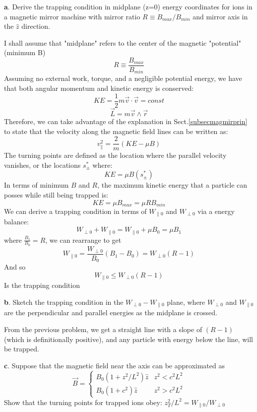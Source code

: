 \documentclass[12pt]{article}
\begin{document}
\textbf{a}. Derive the trapping condition in midplane (z=0) energy coordinates for ions
in a magnetic mirror machine with mirror ratio $R\equiv B_{max}/B_{min}$ and mirror axis in
the $\hat{z}$ direction.
\vspace{3mm}

I shall assume that "midplane" refers to the center of the magnetic "potential" (minimum B)
$$R\equiv\frac{B_{max}}{B_{min}}$$
Assuming no external work, torque, and a negligible potential energy, we have that both angular momentum and kinetic energy is conserved:
$$KE=\frac{1}{2}m\vec{v}\cdot\vec{v}=const$$
$$\vec{L}=m\vec{v}\wedge\vec{r}$$
Therefore, we can take advantage of the explanation in Sect.\ref{subsecmagmirprin} to state that the velocity along the magnetic field lines can be written as:
$$v_{\parallel}^2=\frac{2}{m}(KE-\mu B)$$ 
The turning points are defined as the location where the parallel velocity vanishes, or the locations $s^*_{\pm}$ where:
$$KE=\mu B(s^*_{\pm})$$
In terms of minimum $B$ and $R$, the maximum kinetic energy that a particle can posses while still being trapped is:
$$KE=\mu B_{max}=\mu R B_{min}$$
We can derive a trapping condition in terms of $W_{\parallel0}$ and $W_{\perp0}$ via a energy balance:
$$W_{\perp0}+W_{\parallel0}=W_{\parallel0}+\mu B_0=\mu B_1$$
where $\frac{B_1}{B_0}=R$, we can rearrange to get 
$$W_{\parallel0}=\frac{W_{\perp0}}{B_0}(B_1-B_0)=W_{\perp0}(R-1)$$
And so 
$$\boxed{W_{\parallel0}\leq W_{\perp0}(R-1)}$$
Is the trapping condition
\vspace{3mm}

\noindent\textbf{b}. Sketch the trapping condition in the $W_{\perp 0}-W_{\parallel 0}$ plane, where $W_{\perp 0}$ and $W_{\parallel 0}$ are the perpendicular and parallel energies as the midplane is crossed.
\vspace{1mm}

From the previous problem, we get a straight line with a slope of $(R-1)$ (which is definitionally positive), and any particle with energy below the line, will be trapped.
\vspace{3mm}

\noindent\textbf{c}. Suppose that the magnetic field near the axis can be approximated as
$$\vec{B}= \begin{cases} 
      B_0(1+z^2/L^2)\hat{z} & z^2< c^2L^2 \\
      B_0(1+c^2)\hat{z} & z^2> c^2L^2 
   \end{cases}
$$
Show that the turning points for trapped ions obey: $z^2_T/L^2=W_{\parallel 0}/W_{\perp0}$
\end{document}
